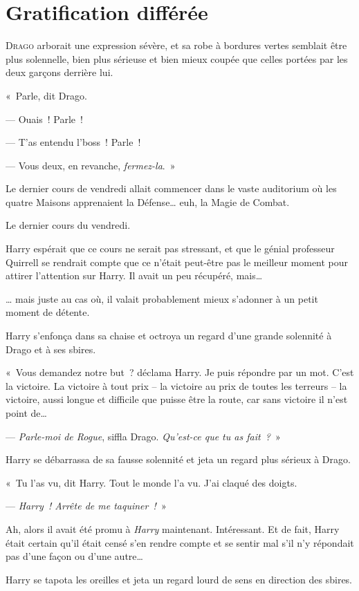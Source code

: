 \chapter{Gratification différée}

\lettrine{D}{rago} arborait une expression sévère, et sa robe à bordures vertes semblait être plus solennelle, bien plus sérieuse et bien mieux coupée que celles portées par les deux garçons derrière lui.

«~Parle, dit Drago.

--- Ouais~!
Parle~!

--- T'as entendu l'boss~!
Parle~!

--- Vous deux, en revanche, \emph{fermez-la}.~»

Le dernier cours de vendredi allait commencer dans le vaste auditorium où les quatre Maisons apprenaient la Défense… euh, la Magie de Combat.

Le dernier cours du vendredi.

Harry espérait que ce cours ne serait pas stressant, et que le génial professeur Quirrell se rendrait compte que ce n'était peut-être pas le meilleur moment pour attirer l'attention sur Harry.
Il avait un peu récupéré, mais…

… mais juste au cas où, il valait probablement mieux s'adonner à un petit moment de détente.

Harry s'enfonça dans sa chaise et octroya un regard d'une grande solennité à Drago et à ses sbires.

«~Vous demandez notre but~? déclama Harry.
Je puis répondre par un mot.
C'est la victoire.
La victoire à tout prix -- la victoire au prix de toutes les terreurs -- la victoire, aussi longue et difficile que puisse être la route, car sans victoire il n'est point de…

--- \emph{Parle-moi de Rogue}, siffla Drago.
\emph{Qu'est-ce que tu as fait~?}~»

Harry se débarrassa de sa fausse solennité et jeta un regard plus sérieux à Drago.

«~Tu l'as vu, dit Harry.
Tout le monde l'a vu.
J'ai claqué des doigts.

--- \emph{Harry~!
Arrête de me taquiner~!}~»

Ah, alors il avait été promu à \emph{Harry} maintenant.
Intéressant.
Et de fait, Harry était certain qu'il était censé s'en rendre compte et se sentir mal s'il n'y répondait pas d'une façon ou d'une autre…

Harry se tapota les oreilles et jeta un regard lourd de sens en direction des sbires.

